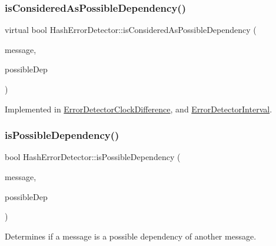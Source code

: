 \subsubsection{\texorpdfstring{is\+Considered\+As\+Possible\+Dependency()}{isConsideredAsPossibleDependency()}}
{\footnotesize\ttfamily virtual bool Hash\+Error\+Detector\+::is\+Considered\+As\+Possible\+Dependency (\begin{DoxyParamCaption}\item[{const \hyperlink{structures_8h_a7e7bdc1d2fff8a9436f2f352b2711ed6}{message\+Info} \&}]{message,  }\item[{const \hyperlink{structures_8h_a7e7bdc1d2fff8a9436f2f352b2711ed6}{message\+Info} \&}]{possible\+Dep }\end{DoxyParamCaption})\hspace{0.3cm}{\ttfamily [pure virtual]}}



Implemented in \hyperlink{class_error_detector_clock_difference_ab20aa1671eb558dea6f06b2440e97e41}{Error\+Detector\+Clock\+Difference}, and \hyperlink{class_error_detector_interval_a33bf470042fb65d833fd0f091374a046}{Error\+Detector\+Interval}.

\mbox{\label{class_hash_error_detector_aaaceeb3d2d27d5f3c85a9b80f959e0fe}} 
\subsubsection{\texorpdfstring{is\+Possible\+Dependency()}{isPossibleDependency()}}
{\footnotesize\ttfamily bool Hash\+Error\+Detector\+::is\+Possible\+Dependency (\begin{DoxyParamCaption}\item[{const \hyperlink{structures_8h_a7e7bdc1d2fff8a9436f2f352b2711ed6}{message\+Info} \&}]{message,  }\item[{const \hyperlink{structures_8h_a7e7bdc1d2fff8a9436f2f352b2711ed6}{message\+Info} \&}]{possible\+Dep }\end{DoxyParamCaption})}



Determines if a message is a possible dependency of another message. 


